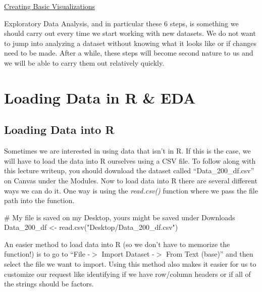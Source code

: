 \documentclass[
  letterpaper,
  DIV=11,
  numbers=noendperiod]{scrreprt}
\newenvironment{Shaded}{\begin{snugshade}}{\end{snugshade}}
\newcommand{\CommentTok}[1]{\textcolor[rgb]{0.37,0.37,0.37}{#1}}
\newcommand{\FunctionTok}[1]{\textcolor[rgb]{0.28,0.35,0.67}{#1}}
\newcommand{\NormalTok}[1]{\textcolor[rgb]{0.00,0.23,0.31}{#1}}
\newcommand{\OtherTok}[1]{\textcolor[rgb]{0.00,0.23,0.31}{#1}}
\newcommand{\StringTok}[1]{\textcolor[rgb]{0.13,0.47,0.30}{#1}}
\begin{document}
\begin{watch}{}{}
    \href{https://youtu.be/SqOE-rSd-_U}{Creating Basic Visualizations}
\end{watch}

Exploratory Data Analysis, and in particular these 6 steps, is something
we should carry out every time we start working with new datasets. We do
not want to jump into analyzing a dataset without knowing what it looks
like or if changes need to be made. After a while, these steps will
become second nature to us and we will be able to carry them out
relatively quickly.


\chapter{Loading Data in R \& EDA}\label{loading-data-in-r-eda}

\section{Loading Data into R}\label{loading-data-into-r}

Sometimes we are interested in using data that isn't in R. If this is
the case, we will have to load the data into R ourselves using a CSV
file. To follow along with this lecture writeup, you should download the
dataset called ``Data\_200\_df.csv'' on Canvas under the Modules. Now to
load data into R there are several different ways we can do it. One way
is using the \emph{read.csv()} function where we pass the file path into
the function.

\begin{Shaded}
\begin{Highlighting}[]
\CommentTok{\# My file is saved on my Desktop, yours might be saved under Downloads}
\NormalTok{Data\_200\_df }\OtherTok{\textless{}{-}} \FunctionTok{read.csv}\NormalTok{(}\StringTok{"Desktop/Data\_200\_df.csv"}\NormalTok{)}
\end{Highlighting}
\end{Shaded}

An easier method to load data into R (so we don't have to memorize the
function!) is to go to ``File -\(>\) Import Dataset -\(>\) From Text
(base)'' and then select the file we want to import. Using this method
also makes it easier for us to customize our request like identifying if
we have row/column headers or if all of the strings should be factors.
\end{document}
